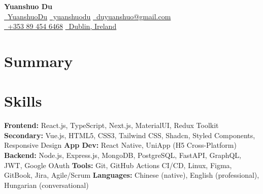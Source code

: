 \documentclass{simpleresume}
\begin{document}
\begin{center}
  {\Large\sffamily\bfseries\color{namecolor} Yuanshuo Du}\\[0.05cm]
  {\sffamily\small
    \href{https://github.com/YuanshuoDu}{\color{accent}\faGithub\color{muted}\ YuanshuoDu}
    \quad\textbullet\quad
    \href{https://linkedin.com/in/yuanshuodu}{\color{accent}\faLinkedin\color{muted}\ yuanshuodu}
    \quad\textbullet\quad
    \href{https://mail.google.com/mail/?view=cm&to=duyuanshuo@gmail.com}{\color{accent}\faEnvelope\color{muted}\ duyuanshuo@gmail.com}
  }\\[0.02cm]
  {\sffamily\small\color{muted}
    \href{tel:+353894546468}{\color{accent}\faPhone\color{muted}\ +353 89 454 6468}
    \quad\textbullet\quad
    \href{https://www.google.com/maps/place/Dublin,+Ireland}{\color{accent}\faMapMarker\ Dublin, Ireland}
  }
\end{center}
\headerrule

\section{Summary}
\vspace{-0.1cm}

\section{Skills}
\noindent
{\sffamily\small\color{secondary}
  \textbf{Frontend:} React.js, TypeScript, Next.js, MaterialUI, Redux Toolkit
  \newline
  \textbf{Secondary:} Vue.js, HTML5, CSS3, Tailwind CSS, Shadcn, Styled Components, Responsive Design
  \newline
  \textbf{App Dev:} React Native, UniApp (H5 Cross-Platform)
  \newline
  \textbf{Backend:} Node.js, Express.js, MongoDB, PostgreSQL, FastAPI, GraphQL, JWT, Google OAuth
  \newline
  \textbf{Tools:} Git, GitHub Actions CI/CD, Linux, Figma, GitBook, Jira, Agile/Scrum
  \newline
  \textbf{Languages:} Chinese (native), English (professional), Hungarian (conversational)
}
\vspace{-0.1cm}
\end{document}
